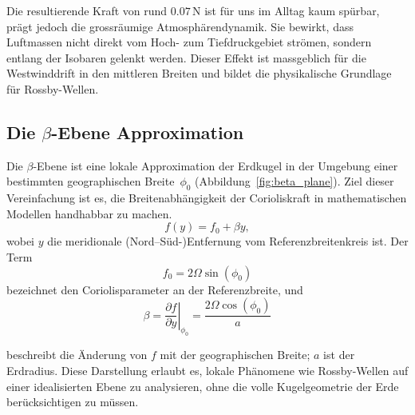 \noindent
Die resultierende Kraft von rund \(0.07\,\mathrm{N}\) ist für uns im Alltag kaum spürbar, prägt jedoch die grossräumige Atmosphärendynamik.
Sie bewirkt, dass Luftmassen nicht direkt vom Hoch- zum Tiefdruckgebiet strömen, sondern entlang der Isobaren gelenkt werden.
Dieser Effekt ist massgeblich für die Westwinddrift in den mittleren Breiten und bildet die physikalische Grundlage für Rossby-Wellen.

\subsection{Die \texorpdfstring{$\beta$}{β}-Ebene Approximation}

Die $\beta$-Ebene ist eine lokale Approximation der Erdkugel in der Umgebung einer bestimmten geographischen Breite~$\phi_0$
(Abbildung~\ref{fig:beta_plane}).
Ziel dieser Vereinfachung ist es, die Breitenabhängigkeit der Corioliskraft in mathematischen Modellen handhabbar zu machen.
\begin{equation}
	f(y) = f_0 + \beta y,
\label{eq:beta_plane}
\end{equation}
wobei $y$ die meridionale (Nord–Süd-)Entfernung vom Referenzbreitenkreis ist. Der Term
\begin{equation}
	f_0 = 2\Omega \sin(\phi_0)
\label{eq:coriolis_parameter_ref}
\end{equation}
bezeichnet den Coriolisparameter an der Referenzbreite, und
\begin{equation}
	\beta = \left.\frac{\partial f}{\partial y}\right|_{\phi_0} = \frac{2\Omega \cos(\phi_0)}{a}
\label{eq:beta_parameter_ref}
\end{equation}

beschreibt die Änderung von $f$ mit der geographischen Breite; $a$ ist der Erdradius. Diese Darstellung erlaubt es, lokale Phänomene wie Rossby-Wellen auf einer idealisierten Ebene zu analysieren, ohne die volle Kugelgeometrie der Erde berücksichtigen zu müssen.

